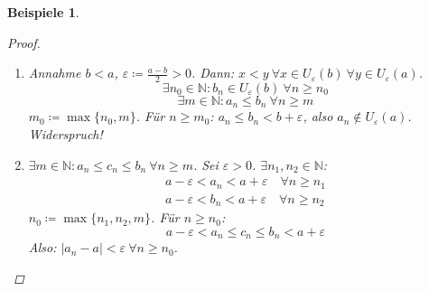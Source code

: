 \documentclass[12pt]{extreport} %
\newcommand{\N}{\mathbb{N}}
\theoremstyle{named}
\theoremstyle{dotless}
\newtheorem*{beispiele}{Beispiele}
\begin{document}
\begin{beispiele}
\begin{proof}
\begin{enumerate}
\begin{enumerate}
					$$
						c_{n} \leq c(|b_{n}-b| + |a_{n}-a|) \eqqcolon \alpha_{n} \xRightarrow[c) (ii), c) (iii)]{a)} \alpha_{n} \rightarrow 0
					$$
					Also: $|c_{n} - 0| = c_{n} \leq \alpha_{n} ~\forall n \in \N$ und $\alpha_{n} \rightarrow 0 \xRightarrow[]{b)} c_{n} \rightarrow 0$.
				\item $\varepsilon \coloneqq \frac{|a|}{2}$; aus (i): $|a_{n}| \rightarrow |a| \Rightarrow \exists n \in N$:
					$$  |a_{n}| \in U_{\varepsilon}(|a|) = (|a| - \varepsilon, |a| + \varepsilon) = (\frac{|a|}{2}, \frac{3}{2} |a|) \quad \forall n \geq m $$
					$\Rightarrow |a_{n}| > \frac{|a|}{2} > 0 ~\forall n \geq m \Rightarrow a_{n} \neq 0 ~\forall n \geq m$. Für $n \geq m$:
					$$ \left| \frac{1}{a_{n}} - \frac{1}{a} \right| = \frac{|a_{n} - a|}{|a_{n}||a|} \leq \frac{2|a_{n} - a|}{|a|^{2}} \eqqcolon \alpha_{n} $$
					$\alpha_{n} \rightarrow 0 \xRightarrow[]{b)} \frac{1}{a_{n}} \rightarrow \frac{1}{a}$.
			  \end{enumerate}
			\item Annahme $b < a$, $\varepsilon \coloneqq \frac{a-b}{2} > 0$.  
				Dann: $x < y ~\forall x \in U_{\varepsilon}(b) ~\forall y \in U_{\varepsilon}(a)$. 
					$$ \exists n_{0} \in \N: b_{n} \in U_{\varepsilon}(b) ~\forall n \geq n_{0} $$
					$$ \exists m \in \N: a_{n} \leq b_{n} ~\forall n \geq m $$
				$m_{0} \coloneqq \max \{ n_{0}, m \}$. Für $n \geq m_{0}$: $a_{n} \leq b_{n} < b + \varepsilon$, also $a_{n} \notin U_{\varepsilon}(a)$. Widerspruch!   
			\item $\exists m \in \N: a_{n} \leq c_{n} \leq b_{n} ~\forall n \geq m$. Sei $\varepsilon > 0$. $\exists n_{1}, n_{2} \in \N$: 
				\begin{align*}
					a - \varepsilon < a_{n} < a + \varepsilon \quad \forall n \geq n_{1} \\
					a - \varepsilon < b_{n} < a + \varepsilon \quad \forall n \geq n_{2}
				\end{align*}
				$n_{0} \coloneqq \max \{ n_{1}, n_{2}, m \}$. Für $n \geq n_{0}$:
				$$
					a - \varepsilon < a_{n} \leq c_{n} \leq b_{n} < a + \varepsilon
				$$
				Also: $|a_{n} - a| < \varepsilon ~\forall n \geq n_{0}$.
		\end{enumerate}	
	\end{proof}	
\end{beispiele}
\end{document}
